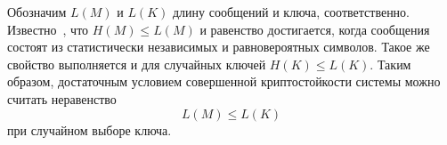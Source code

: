 






Обозначим $L(M)$ и $L(K)$ длину сообщений и ключа, соответственно. Известно~\cite{GabPil:2007}, что $H(M)\leq L(M)$ и равенство достигается, когда сообщения состоят из статистически независимых и равновероятных символов. Такое же свойство выполняется и для случайных ключей $H(K)\leq L(K)$. Таким образом, достаточным условием совершенной криптостойкости системы можно считать неравенство
 \[ L(M) \leq L(K)\]
при случайном выборе ключа.



